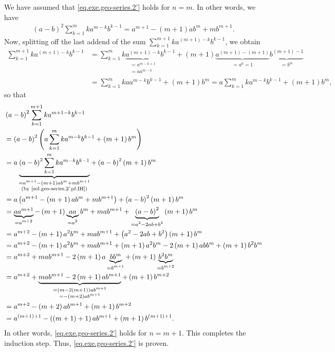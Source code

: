 \documentclass[paper=a4, fontsize=12pt]{scrartcl} %
\newcommand{\tup}[1]{\left( #1 \right)}
\newcommand{\underbrack}[2]{\underbrace{#1}_{\substack{#2}}}
\let\sumnonlimits\sum
\renewcommand{\sum}{\sumnonlimits\limits}
\theoremstyle{plainsl}
\theoremstyle{definition}
\theoremstyle{remark}
\begin{document}
\begin{itemize}
We have assumed that \eqref{eq.exe.geo-series.2'}
holds for $n = m$. In other words, we have
\begin{align}
\tup{a-b}^2 \sum_{k = 1}^m k a^{m-k} b^{k-1}
= a^{m+1} - \tup{m+1} a b^m + m b^{m+1} .
\label{sol.geo-series.2'.pf.IH}
\end{align}
Now, splitting off the last addend of the sum
$\sum_{k = 1}^{m+1} k a^{\tup{m+1}-k} b^{k-1}$, we obtain
\begin{align*}
  \sum_{k = 1}^{m+1} k a^{\tup{m+1}-k} b^{k-1}
& = \sum_{k = 1}^m k \underbrack{a^{\tup{m+1}-k}}{= a^{m-k+1} \\ = a a^{m-k}} b^{k-1}
      + \tup{m+1}
        \underbrack{a^{\tup{m+1}-\tup{m+1}}}{= a^0 = 1}
        \underbrack{b^{\tup{m+1}-1}}{= b^m} \\
& = \sum_{k = 1}^m k a a^{m-k} b^{k-1} + \tup{m+1} b^m
  = a \sum_{k = 1}^m k a^{m-k} b^{k-1} + \tup{m+1} b^m ,
\end{align*}
so that
\begin{align*}
& \tup{a-b}^2 \sum_{k = 1}^{m+1} k a^{{m+1}-k} b^{k-1} \\
& = \tup{a-b}^2 \tup{a \sum_{k = 1}^m k a^{m-k} b^{k-1} + \tup{m+1} b^m} \\
& = a \underbrack{\tup{a-b}^2 \sum_{k = 1}^m k a^{m-k} b^{k-1}}{= a^{m+1} - \tup{m+1} a b^m + m b^{m+1} \\ \text{(by \eqref{sol.geo-series.2'.pf.IH})}}
    + \tup{a-b}^2 \tup{m+1} b^m \\
& = a \tup{a^{m+1} - \tup{m+1} a b^m + m b^{m+1}} + \tup{a-b}^2 \tup{m+1} b^m \\
& = \underbrack{a a^{m+1}}{= a^{m+2}}
    - \tup{m+1} \underbrack{a a}{= a^2} b^m + m a b^{m+1}
    + \underbrack{\tup{a-b}^2}{= a^2 - 2ab + b^2} \tup{m+1} b^m \\
& = a^{m+2} - \tup{m+1} a^2 b^m + m a b^{m+1}
    + \tup{a^2 - 2ab + b^2} \tup{m+1} b^m \\
& = a^{m+2} - \tup{m+1} a^2 b^m + m a b^{m+1}
    + \tup{m+1} a^2 b^m - 2 \tup{m+1} a b b^m + \tup{m+1} b^2 b^m \\
& = a^{m+2} + m a b^{m+1}
    - 2 \tup{m+1} a \underbrack{b b^m}{= b^{m+1}} + \tup{m+1} \underbrack{b^2 b^m}{= b^{m+2}} \\
& = a^{m+2} + \underbrack{m a b^{m+1} - 2 \tup{m+1} a b^{m+1}}{= \tup{m - 2 \tup{m+1}} a b^{m+1} \\ = - \tup{m+2} a b^{m+1} } + \tup{m+1} b^{m+2} \\
& = a^{m+2} - \tup{m+2} a b^{m+1} + \tup{m+1} b^{m+2} \\
& = a^{\tup{m+1}+1} - \tup{\tup{m+1}+1} a b^{m+1} + \tup{m+1} b^{\tup{m+1}+1} .
\end{align*}
In other words, \eqref{eq.exe.geo-series.2'} holds for $n = m+1$.
This completes the induction step.
Thus, \eqref{eq.exe.geo-series.2'} is proven.

\end{itemize}
\end{document}
